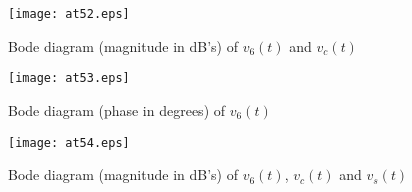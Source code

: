 \begin{figure}[H] \centering
\texttt{[image: at52.eps]}
\caption{Bode diagram (magnitude in dB's) of $v_6(t)$ and $v_c(t)$}
\end{figure}

\begin{figure}[H] \centering
\label{fig:52}
\texttt{[image: at53.eps]}
\caption{{Bode diagram (phase in degrees) of $v_6(t)$ } }
\label{fig:53}
\end{figure}

\begin{figure}[H] \centering
\texttt{[image: at54.eps]}
\caption{{Bode diagram (magnitude in dB's) of $v_6(t)$, $v_c(t)$ and $v_s(t)$ }}
\label{fig:54}
\end{figure}


